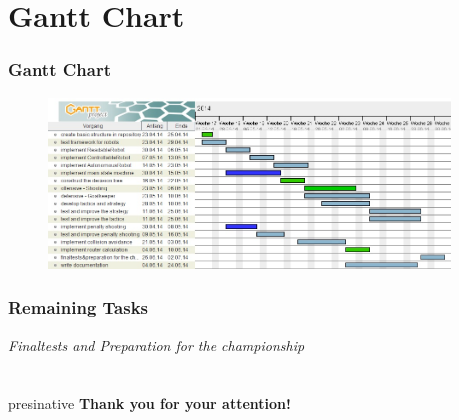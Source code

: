 \documentclass[hyperref={pdfpagelabels=false}]{beamer}
\begin{document}
\subsection{}
\section{Gantt Chart} 
\begin{frame}
	\frametitle{Gantt Chart} 
	\begin{figure}
		\centering
		\includegraphics[width=0.95\textwidth]{Pictures/gantt1}
	\end{figure}
\end{frame}

\begin{frame}
    \frametitle{Remaining Tasks}
    \textit{\Large Finaltests and Preparation for the championship}
\end{frame}

\section{}
\begin{frame}
	\hfill
	\begin{beamercolorbox}[shadow=true, rounded=true, wd=10cm]{presinative}
		\centering
		\Large{\textbf{Thank you for your attention!}}
	\end{beamercolorbox}
	\hfill
\end{frame}
\end{document}
